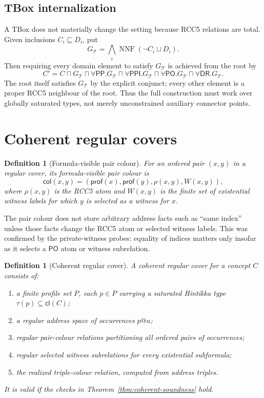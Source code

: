 \documentclass[11pt]{article}
\newtheorem{definition}[theorem]{Definition}
\newcommand{\PP}{\mathsf{PP}}
\newcommand{\PPI}{\mathsf{PPI}}
\newcommand{\PO}{\mathsf{PO}}
\newcommand{\DR}{\mathsf{DR}}
\newcommand{\cl}{\mathsf{cl}}
\newcommand{\col}{\mathsf{col}}
\newcommand{\prof}{\mathsf{prof}}
\begin{document}
\subsection{TBox internalization}
A TBox does not materially change the setting because RCC5 relations are total.  Given inclusions $C_i\sqsubseteq D_i$, put
\[
G_{\mathcal T}=\bigwedge_i \operatorname{NNF}(\neg C_i\sqcup D_i).
\]
Then requiring every domain element to satisfy $G_{\mathcal T}$ is achieved from the root by
\[
C' = C\sqcap G_{\mathcal T}\sqcap
\forall\PP.G_{\mathcal T}\sqcap
\forall\PPI.G_{\mathcal T}\sqcap
\forall\PO.G_{\mathcal T}\sqcap
\forall\DR.G_{\mathcal T}.
\]
The root itself satisfies $G_{\mathcal T}$ by the explicit conjunct; every other element is a proper RCC5 neighbour of the root.  Thus the full construction must work over globally saturated types, not merely unconstrained auxiliary connector points.

\section{Coherent regular covers}

\begin{definition}[Formula-visible pair colour]
For an ordered pair $(x,y)$ in a regular cover, its formula-visible pair colour is
\[
\col(x,y)=(\prof(x),\prof(y),\rho(x,y),W(x,y)),
\]
where $\rho(x,y)$ is the RCC5 atom and $W(x,y)$ is the finite set of existential witness labels for which $y$ is selected as a witness for $x$.
\end{definition}

The pair colour does not store arbitrary address facts such as ``same index'' unless those facts change the RCC5 atom or selected witness labels.  This was confirmed by the private-witness probes: equality of indices matters only insofar as it selects a $\PO$ atom or witness subrelation.

\begin{definition}[Coherent regular cover]
A coherent regular cover for a concept $C$ consists of:
\begin{enumerate}
\item a finite profile set $P$, each $p\in P$ carrying a saturated Hintikka type $\tau(p)\subseteq \cl(C)$;
\item a regular address space of occurrences $p@u$;
\item regular pair-colour relations partitioning all ordered pairs of occurrences;
\item regular selected witness subrelations for every existential subformula;
\item the realized triple-colour relation, computed from address triples.
\end{enumerate}
It is valid if the checks in Theorem~\ref{thm:coherent-soundness} hold.
\end{definition}
\end{document}
